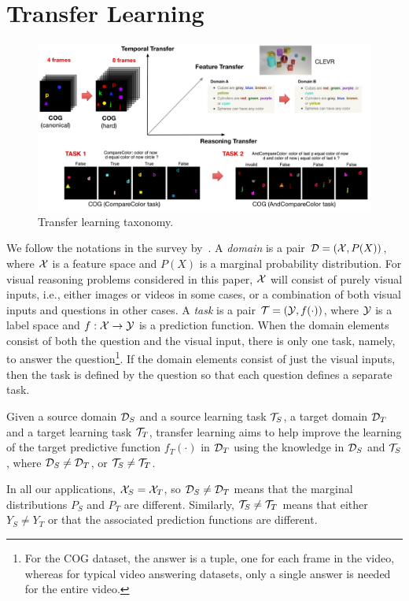 \section{Transfer Learning}

\begin{figure}
	\centering
	\includegraphics[width=\textwidth]{figures/transfer_taxo}
	\caption{Transfer learning taxonomy.}\label{fig:taskonomy}
\end{figure}

We follow the notations in the survey by~\cite{pan2009survey}.
A \emph{domain} is a pair $\mathcal{D} = (\mathcal{X},P(X))$, where $\mathcal{X}$ is a feature space and $P(X)$ is a marginal probability distribution.
For visual reasoning problems considered in this paper, 
$\mathcal{X}$ will consist of purely visual inputs, i.e., either images or videos in some cases, or 
a combination of both visual inputs and questions in other cases. 
A \emph{task} is a pair $\mathcal{T}= (\mathcal{Y},f(\cdot))$, where $\mathcal{Y}$ is a label space and $f: \mathcal{X} \to \mathcal{Y}$ is a prediction function. 
When the domain elements consist of both the question and the visual input, there is only one task, namely, to answer the 
question\footnote{%
	For the COG dataset, the answer is a tuple, one for each frame in the video, whereas for typical video answering datasets,
	only a single answer is needed for the entire video.}. %
If the domain elements consist of just the visual inputs, then the task is defined by the question so that each question 
defines a separate task.

\begin{definition}
	\label{defn:transfer}
	Given a source domain $\mathcal{D}_S$ and a source learning task $\mathcal{T}_S$, a target domain $\mathcal{D}_T$ and a target learning task $\mathcal{T}_T$, transfer learning aims to help improve the 
	learning of the target predictive function $f_T(\cdot)$ in $\mathcal{D}_T$ using the knowledge  in $\mathcal{D}_S$ and $\mathcal{T}_S$, where $\mathcal{D}_S \ne \mathcal{D}_T$, or $\mathcal{T}_S \ne \mathcal{T}_T$.
\end{definition}
In all our applications, $\mathcal{X}_S = \mathcal{X}_T$, so $\mathcal{D}_S \ne \mathcal{D}_T$ means that the marginal distributions $P_S$ and $P_T$ are different.
Similarly, $\mathcal{T}_S \ne \mathcal{T}_T$ means that either $Y_S \ne Y_T$ or that the associated prediction functions are different.

